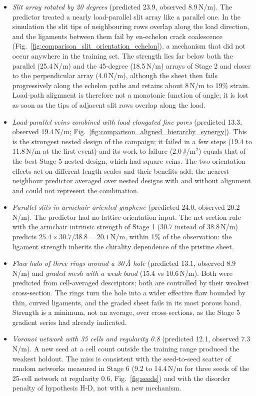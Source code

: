 \begin{itemize}
\item \emph{Slit array rotated by 20 degrees} (predicted 23.9, observed 8.9\,N/m). The predictor treated a nearly load-parallel slit array like a parallel one. In the simulation the slit tips of neighbouring rows overlap along the load direction, and the ligaments between them fail by en-echelon crack coalescence (Fig.~\ref{fig:comparison_slit_orientation_echelon}), a mechanism that did not occur anywhere in the training set. The strength lies far below both the parallel (25.4\,N/m) and the 45-degree (18.5\,N/m) arrays of Stage 2 and closer to the perpendicular array (4.0\,N/m), although the sheet then fails progressively along the echelon paths and retains about 8\,N/m to 19\% strain. Load-path alignment is therefore not a monotonic function of angle; it is lost as soon as the tips of adjacent slit rows overlap along the load.
\item \emph{Load-parallel veins combined with load-elongated fine pores} (predicted 13.3, observed 19.4\,N/m; Fig.~\ref{fig:comparison_aligned_hierarchy_synergy}). This is the strongest nested design of the campaign; it failed in a few steps (19.4 to 11.8\,N/m at the first event) and its work to failure (2.0\,J/m$^2$) equals that of the best Stage 5 nested design, which had square veins. The two orientation effects act on different length scales and their benefits add; the nearest-neighbour predictor averaged over nested designs with and without alignment and could not represent the combination.
\item \emph{Parallel slits in armchair-oriented graphene} (predicted 24.0, observed 20.2\,N/m). The predictor had no lattice-orientation input. The net-section rule with the armchair intrinsic strength of Stage 1 (30.7 instead of 38.8\,N/m) predicts $25.4 \times 30.7/38.8 = 20.1$\,N/m, within 1\% of the observation: the ligament strength inherits the chirality dependence of the pristine sheet.
\item \emph{Flaw halo of three rings around a 30\,\AA{} hole} (predicted 13.1, observed 8.9\,N/m) and \emph{graded mesh with a weak band} (15.4 vs 10.6\,N/m). Both were predicted from cell-averaged descriptors; both are controlled by their weakest cross-section. The rings turn the hole into a wider effective flaw bounded by thin, curved ligaments, and the graded sheet fails in its most porous band. Strength is a minimum, not an average, over cross-sections, as the Stage 5 gradient series had already indicated.
\item \emph{Voronoi network with 35 cells and regularity 0.8} (predicted 12.1, observed 7.3\,N/m). A new seed at a cell count outside the training range produced the weakest holdout. The miss is consistent with the seed-to-seed scatter of random networks measured in Stage 6 (9.2 to 14.4\,N/m for three seeds of the 25-cell network at regularity 0.6, Fig.~\ref{fig:seeds}) and with the disorder penalty of hypothesis H-D, not with a new mechanism.
\end{itemize}

